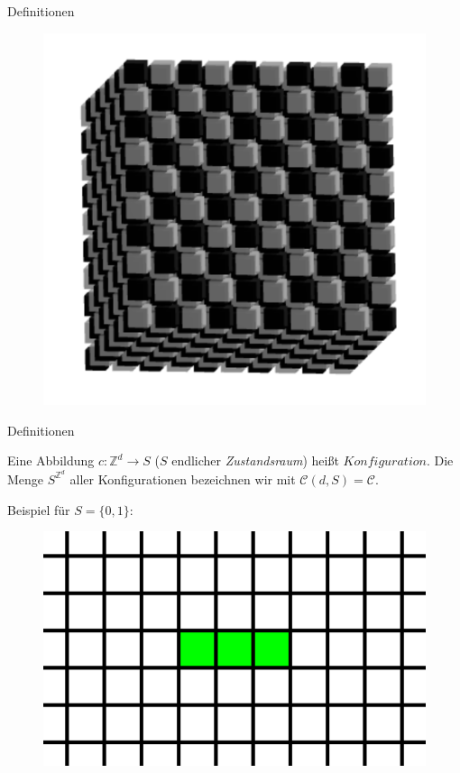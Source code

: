 \documentclass[aspectratio=169]{beamer}
\begin{document}
\begin{frame}{Definitionen}
\begin{multicols*}{3}
      \begin{figure}[H]
          \centering
          \includegraphics[width = 0.35 \textheight]{3d_cellspace.png}
      \end{figure}


    \end{multicols*}

  \end{frame}



  \begin{frame}{Definitionen}
    \begin{definition*}
      Eine Abbildung $c: \mathbb{Z}^d \to S$ ($S$ endlicher \textit{Zustandsraum}) heißt $Konfiguration$.
      Die Menge $S^{\mathbb{Z}^d}$ aller Konfigurationen bezeichnen wir mit $\mathcal{C}(d, S) = \mathcal{C}$.
    \end{definition*}

    Beispiel für $S = \{0, 1\}$:
    \begin{figure}[H]
        \centering
        \includegraphics[width = 0.35 \textheight]{configuration.png}
    \end{figure}

  \end{frame}
\end{document}
